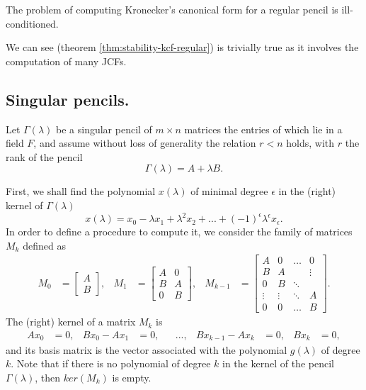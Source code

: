 \begin{theorem} \label{thm:stability-kcf-regular}
    The problem of computing Kronecker's canonical form for a regular pencil
    is ill-conditioned.
\end{theorem} 

We can see  (theorem \ref{thm:stability-kcf-regular}) is
trivially true as it involves the computation of many JCFs.

\subsection*{Singular pencils.}

Let \(\Gamma(\lambda)\) be a singular pencil of \(m \times n\) matrices the entries of which lie in a field \(F\),
and assume without loss of generality the relation \(r < n\) holds, with \(r\) the rank of the pencil
\[\Gamma(\lambda) = A + \lambda B.\]

First, we shall find the polynomial \(x(\lambda)\) of minimal degree \(\epsilon\) in the (right) kernel
of \(\Gamma(\lambda)\)
\[
    x(\lambda) = x_{0} - \lambda x_{1} + \lambda^2 x_{2} + ... + (-1)^\epsilon \lambda^\epsilon x_{\epsilon}.
\]
In order to define a procedure to compute it, we consider the family of matrices
\(M_{k}\) defined as
\begin{align} \label{m-matrices}
    M_{0} &=
        \begin{bmatrix}
            A \\
            B
        \end{bmatrix},
    & M_{1} &=
        \begin{bmatrix}
            A & 0 \\
            B & A \\
            0 & B
        \end{bmatrix},
    & M_{k-1} &=
        \begin{bmatrix}
            A & 0 & \hdots &    0   \\
            B & A &        & \vdots \\
            0 & B & \ddots & \\
            \vdots & \vdots & \ddots & A \\
            0      &    0   & \hdots & B
        \end{bmatrix}.
\end{align}
The (right) kernel of a matrix \(M_{k}\) is
\begin{align*}
   Ax_{0} &= 0, &
   Bx_{0} - Ax_{1} &= 0, &
   & ..., &
   Bx_{k-1} - Ax_{k} &= 0, &
   Bx_{k} &= 0,
\end{align*}
and its basis matrix is the vector associated with the polynomial \(g(\lambda)\) of degree \(k\). Note that if
there is no polynomial of degree \(k\) in the kernel of the pencil \(\Gamma(\lambda)\), then \(ker(M_{k})\) is empty.

